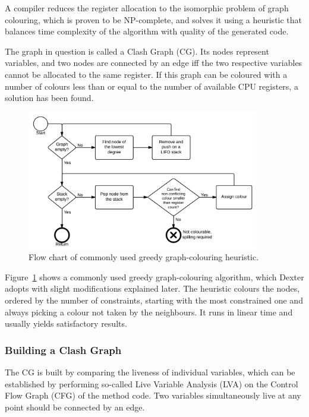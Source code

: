 \documentclass[12pt,twoside,notitlepage]{report}
\begin{document}
A compiler reduces the register allocation to the isomorphic problem of graph colouring, which is proven to be NP-complete, and solves it using a heuristic that balances time complexity of the algorithm with quality of the generated code. 

The graph in question is called a Clash Graph (CG). Its nodes represent variables, and two nodes are connected by an edge iff the two respective variables cannot be allocated to the same register. If this graph can be coloured with a number of colours less than or equal to the number of available CPU registers, a solution has been found. 

\begin{figure}
	\centerline{	
		\includegraphics[width=0.9\textwidth]{figs/fig_implementation_gc.png}
	}
	\caption{Flow chart of commonly used greedy graph-colouring heuristic.}
	\label{fig:Implementation_GraphColouring}
\end{figure}

Figure~\ref{fig:Implementation_GraphColouring} shows a commonly used greedy graph-colouring algorithm, which Dexter adopts with slight modifications explained later. The heuristic colours the nodes, ordered by the number of constraints, starting with the most constrained one and always picking a colour not taken by the neighbours. It runs in linear time and usually yields satisfactory results.

\subsubsection{Building a Clash Graph}

The CG is built by comparing the liveness of individual variables, which can be established by performing so-called Live Variable Analysis (LVA) on the Control Flow Graph (CFG) of the method code. Two variables simultaneously live at any point should be connected by an edge.
\end{document}
